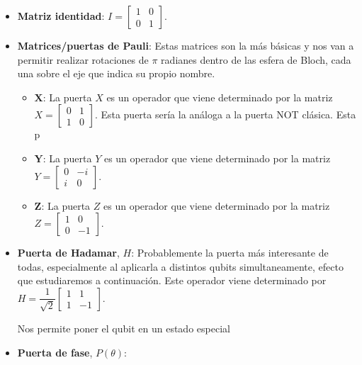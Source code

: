  \begin{itemize}
    \item \textbf{Matriz identidad}: $I = \begin{bmatrix} 1 & 0\\0 & 1 \end{bmatrix}$.
    
    \item \textbf{Matrices/puertas de Pauli}: Estas matrices son la más básicas y nos van a permitir realizar rotaciones de $\pi$ radianes dentro de las esfera de Bloch, cada una sobre el eje que indica su propio nombre.
    \begin{itemize}
        \item $\boldsymbol X$: La puerta $X$ es un operador que viene determinado por la matriz \begin{math} X = \begin{bmatrix} 0 & 1\\1 & 0 \end{bmatrix}\end{math}. Esta puerta sería la análoga a la puerta NOT clásica. \newline
        Esta p
        \item $\boldsymbol Y$: La puerta $Y$ es un operador que viene determinado por la matriz \begin{math} Y = \begin{bmatrix} 0 & -i\\i & 0 \end{bmatrix}\end{math}.
        \item $\boldsymbol Z$: La puerta $Z$ es un operador que viene determinado por la matriz \begin{math} Z = \begin{bmatrix} 1 & 0\\0 & -1 \end{bmatrix}\end{math}.
    \end{itemize}
    
    \item \textbf{Puerta de Hadamar}, $H$: Probablemente la puerta más interesante de todas, especialmente al aplicarla a distintos qubits simultaneamente, efecto que estudiaremos a continuación. Este operador viene determinado por $H = \dfrac{1}{\sqrt{2}} \begin{bmatrix} 1 & 1\\1 & -1 \end{bmatrix}$. \newline
     
    Nos permite poner el qubit en un estado especial
     
    \item \textbf{Puerta de fase}, $P(\theta)$:
 \end{itemize}
 
